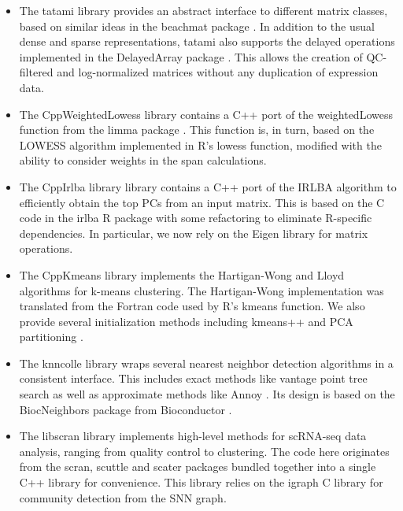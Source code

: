 \documentclass{article}
\begin{document}
\begin{itemize}
\item The tatami library \cite{tatami} provides an abstract interface to different matrix classes, 
based on similar ideas in the beachmat package \cite{lun2018beachmat}. 
In addition to the usual dense and sparse representations, tatami also supports the delayed operations implemented in the DelayedArray package \cite{delayedarray}.
This allows the creation of QC-filtered and log-normalized matrices without any duplication of expression data.
\item The CppWeightedLowess library \cite{cppweightedlowess} contains a C++ port of the weightedLowess function from the limma package \cite{ritchie2015limma}.
This function is, in turn, based on the LOWESS algorithm \cite{cleveland1979robust} implemented in R's lowess function, 
modified with the ability to consider weights in the span calculations.
\item The CppIrlba library \cite{cppirlba} library contains a C++ port of the IRLBA algorithm \cite{baglama2005augmented} to efficiently obtain the top PCs from an input matrix.
This is based on the C code in the irlba R package \cite{irlba} with some refactoring to eliminate R-specific dependencies.
In particular, we now rely on the Eigen library \cite{eigenweb} for matrix operations.
\item The CppKmeans library \cite{cppkmeans} implements the Hartigan-Wong \cite{hartiganwong} and Lloyd algorithms \cite{lloyd} for k-means clustering.
The Hartigan-Wong implementation was translated from the Fortran code used by R's kmeans function.
We also provide several initialization methods including kmeans++ \cite{vassilvitskii2006kmeanspp} and PCA partitioning \cite{su2007search}.
\item The knncolle library \cite{knncolle} wraps several nearest neighbor detection algorithms in a consistent interface. 
This includes exact methods like vantage point tree search \cite{yianilos1993data} as well as approximate methods like Annoy \cite{annoy}.
Its design is based on the BiocNeighbors package from Bioconductor \cite{biocneighbors}.
\item The libscran library \cite{libscran} implements high-level methods for scRNA-seq data analysis, ranging from quality control to clustering.
The code here originates from the scran, scuttle and scater packages \cite{lun2016step,lun2017scater} bundled together into a single C++ library for convenience. 
This library relies on the igraph C library \cite{csardi2006igraph} for community detection from the SNN graph.

\end{itemize}
\end{document}
